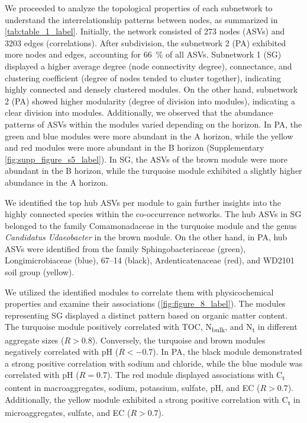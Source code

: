 We proceeded to analyze the topological properties of each subnetwork to understand the interrelationship patterns between nodes, as summarized in \cref{tab:table_1_label}. Initially, the network consisted of 273 nodes (ASVs) and \num{3203} edges (correlations). After subdivision, the subnetwork 2 (PA) exhibited more nodes and edges, accounting for \SI{66}{\percent} of all ASVs. Subnetwork 1 (SG) displayed a higher average degree (node connectivity degree), connectance, and clustering coefficient (degree of nodes tended to cluster together), indicating highly connected and densely clustered modules. On the other hand, subnetwork 2 (PA) showed higher modularity (degree of division into modules), indicating a clear division into modules. Additionally, we observed that the abundance patterns of ASVs within the modules varied depending on the horizon. In PA, the green and blue modules were more abundant in the A horizon, while the yellow and red modules were more abundant in the B horizon (Supplementary \cref{fig:supp_figure_s5_label}). In SG, the ASVs of the brown module were more abundant in the B horizon, while the turquoise module exhibited a slightly higher abundance in the A horizon.

We identified the top hub ASVs per module to gain further insights into the highly connected species within the co-occurrence networks. The hub ASVs in SG belonged to the family Comamonadaceae in the turquoise module and the genus \textit{Candidatus Udaeobacter} in the brown module. On the other hand, in PA, hub ASVs were identified from the family Sphingobacteriaceae (green), Longimicrobiaceae (blue), 67–14 (black), Ardenticatenaceae (red), and WD2101 soil group (yellow).

We utilized the identified modules to correlate them with physicochemical properties and examine their associations (\cref{fig:figure_8_label}). The modules representing SG displayed a distinct pattern based on organic matter content. The turquoise module positively correlated with TOC, N\textsubscript{bulk}, and N\textsubscript{t} in different aggregate sizes (\(R > 0.8\)). Conversely, the turquoise and brown modules negatively correlated with pH (\(R < -0.7\)). In PA, the black module demonstrated a strong positive correlation with sodium and chloride, while the blue module was correlated with pH (\(R=0.7\)). The red module displayed associations with C\textsubscript{t} content in macroaggregates, sodium, potassium, sulfate, pH, and EC (\(R > 0.7\)). Additionally, the yellow module exhibited a strong positive correlation with C\textsubscript{t} in microaggregates, sulfate, and EC (\(R > 0.7\)).

